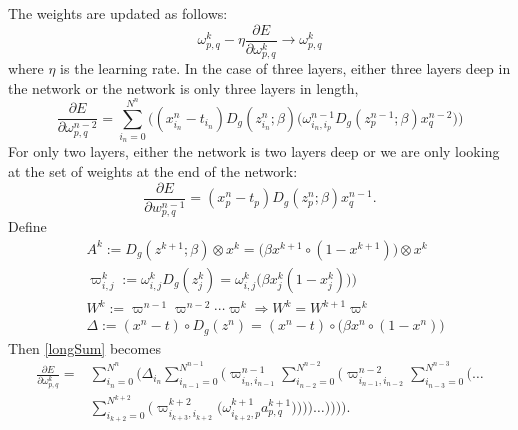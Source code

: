 \documentclass{amsart}
\begin{document}
%
The weights are updated as follows:
%
\begin{equation*}
\omega_{p,q}^k - \eta \frac{\partial E}{\partial \omega_{p,q}^k} \rightarrow \omega_{p,q}^k
\end{equation*}
%
where $\eta$ is the learning rate.
%
%
In the case of three layers, either three layers deep in the network or the network is only three layers in length,
%
\begin{equation*}
\frac{\partial E}{\partial \omega_{p,q}^{n-2}} = \sum_{i_n=0}^{N^n} \Bigg( (x_{i_n}^n - t_{i_n}) D_g(z_{i_n}^n; \beta) \Bigg( \omega_{{i_n},i_p}^{n-1} D_g(z_p^{n-1};\beta) x_q^{n-2} \Bigg) \Bigg)
\end{equation*}
%
For only two layers, either the network is two layers deep or we are only looking at the set of weights at the end of the network:
%
\begin{equation*}
\frac{\partial E}{\partial w_{p,q}^{n-1}} = (x_p^{n} - t_p) D_g(z_p^{n};\beta) x_q^{n-1}.
\end{equation*}
%
\newpage
Define
%
\begin{equation}
\label{definitions}
\begin{aligned}
&A^k := D_g(z^{k+1};\beta) \otimes x^k = \big(\beta x^{k+1} \circ (1 - x^{k+1}) \big) \otimes x^k\\
&\varpi_{i,j}^k := \omega_{i,j}^k D_g(z_j^k) = \omega_{i,j}^k \big( \beta x_j^k (1 - x_j^k)) \big)\\
&W^k := \varpi^{n-1} \varpi^{n-2} \cdots \varpi^k \Rightarrow W^k = W^{k+1} \varpi^k\\
&\Delta := (x^n - t) \circ D_g(z^n) = (x^n - t) \circ \big( \beta x^n \circ (1 - x^n) \big)
\end{aligned}
\end{equation}
%
Then \eqref{longSum} becomes
%
\begin{equation}
\label{shortSum}
\begin{aligned}
\frac{\partial E}{\partial \omega_{p,q}^k} = &\sum_{i_n=0}^{N^n} \Bigg( \Delta_{i_n} \sum_{i_{n-1}=0}^{N^{n-1}} \Bigg(\varpi_{i_n,i_{n-1}}^{n-1} \sum_{i_{n-2}=0}^{N^{n-2}} \Bigg(\varpi_{i_{n-1},i_{n-2}}^{n-2} \sum_{i_{n-3}=0}^{N^{n-3}} \Bigg( \ldots\\
&\sum_{i_{k+2}=0}^{N^{k+2}} \Bigg(\varpi_{i_{k+3},i_{k+2}}^{k+2} \Bigg(\omega_{i_{k+2},p}^{k+1} a_{p,q}^{k+1} \Bigg)\Bigg)\Bigg)\Bigg) \ldots \Bigg)\Bigg)\Bigg)\Bigg).
\end{aligned}
\end{equation}
\end{document}
